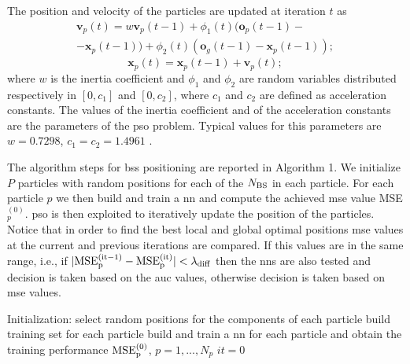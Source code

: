 \documentclass[twocolumns]{IEEEtran}
\begin{document}
The position and velocity of the particles are updated at iteration $t$ as
  \begin{equation}\label{eq: v up}
\begin{split}
  \bm{v}_p(t) = w\bm{v}_p(t-1)+\phi_1(t)(\bm{o}_p(t-1)-\\
  -\bm{x}_p(t-1))+\phi_2(t)(\bm{o}_g(t-1)-\bm{x}_p(t-1));
  \end{split}
  \end{equation}
  \begin{equation}\label{eq: p up}
  \bm{x}_p(t) = \bm{x}_p(t-1) + \bm{v}_p(t);
 \end{equation}
where $w$ is the inertia coefficient and $\phi_1$ and $\phi_2$ are random variables distributed respectively in $[0,c_1]$ and $[0,c_2]$, where $c_1$ and $c_2$ are defined as acceleration constants. The values of the inertia coefficient and of the acceleration constants are the parameters of the \ac{pso} problem. Typical values for this parameters are $w=0.7298$, $c_1=c_2=1.4961$ \cite{Kennedy-11}.

The algorithm steps for \acp{bs} positioning are reported in Algorithm 1. We initialize $P$ particles with random positions for each of the $N_{\rm BS}$ in each particle. For each particle $p$ we then build and train a \ac{nn} and compute the achieved \ac{mse} value MSE$_p^{(0)}$. \ac{pso} is then exploited to iteratively update the position of the particles. Notice that in order to find the best local and global optimal positions \ac{mse} values at the current and previous iterations are compared. If this values are in the same range, i.e., if $|\rm{MSE}_p^{(it-1)}-\rm{MSE}_p^{(it)}|<\lambda_{\rm diff}$ then the \acp{nn}  are also tested and decision is taken based on the \ac{auc} values, otherwise decision is taken based on \ac{mse} values.

 \begin{algorithm}[t]
   \scriptsize

  Initialization: select random positions for the components of each particle\;
                  build training set for each particle\;
                  build and train a \ac{nn} for each particle and obtain the training performance $\rm{MSE}_p^{(0)}$, $p=1,...,N_p$\;
                  $it = 0$\;

    
\caption{BSs positioning algorithm}
 \end{algorithm}
\end{document}
